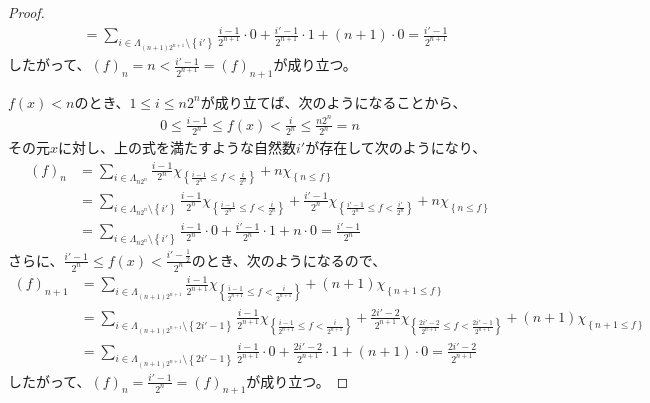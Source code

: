 \documentclass[dvipdfmx]{jsarticle}
\begin{document}
\begin{proof}
\begin{align*}
&= \sum_{i \in \varLambda_{(n + 1)2^{n + 1}} \setminus \left\{ i' \right\}} {\frac{i - 1}{2^{n + 1}} \cdot 0} + \frac{i' - 1}{2^{n + 1}} \cdot 1 + (n + 1) \cdot 0 = \frac{i' - 1}{2^{n + 1}}
\end{align*}
したがって、$(f)_{n} = n < \frac{i' - 1}{2^{n + 1}} = (f)_{n + 1}$が成り立つ。\par
$f(x) < n$のとき、$1 \leq i \leq n2^{n}$が成り立てば、次のようになることから、
\begin{align*}
0 \leq \frac{i - 1}{2^{n}} \leq f(x) < \frac{i}{2^{n}} \leq \frac{n2^{n}}{2^{n}} = n
\end{align*}
その元$x$に対し、上の式を満たすような自然数$i'$が存在して次のようになり、
\begin{align*}
(f)_{n} &= \sum_{i \in \varLambda_{n2^{n}}} {\frac{i - 1}{2^{n}}\chi_{\left\{ \frac{i - 1}{2^{n}} \leq f < \frac{i}{2^{n}} \right\}}} + n\chi_{\left\{ n \leq f \right\}}\\
&= \sum_{i \in \varLambda_{n2^{n}} \setminus \left\{ i' \right\}} {\frac{i - 1}{2^{n}}\chi_{\left\{ \frac{i - 1}{2^{n}} \leq f < \frac{i}{2^{n}} \right\}}} + \frac{i' - 1}{2^{n}}\chi_{\left\{ \frac{i' - 1}{2^{n}} \leq f < \frac{i'}{2^{n}} \right\}} + n\chi_{\left\{ n \leq f \right\}}\\
&= \sum_{i \in \varLambda_{n2^{n}} \setminus \left\{ i' \right\}} {\frac{i - 1}{2^{n}} \cdot 0} + \frac{i' - 1}{2^{n}} \cdot 1 + n \cdot 0 = \frac{i' - 1}{2^{n}}
\end{align*}
さらに、$\frac{i' - 1}{2^{n}} \leq f(x) < \frac{i' - \frac{1}{2}}{2^{n}}$のとき、次のようになるので、
\begin{align*}
(f)_{n + 1} &= \sum_{i \in \varLambda_{(n + 1)2^{n + 1}}} {\frac{i - 1}{2^{n + 1}}\chi_{\left\{ \frac{i - 1}{2^{n + 1}} \leq f < \frac{i}{2^{n + 1}} \right\}}} + (n + 1)\chi_{\left\{ n + 1 \leq f \right\}}\\
&= \sum_{i \in \varLambda_{(n + 1)2^{n + 1}} \setminus \left\{ 2i' - 1 \right\}} {\frac{i - 1}{2^{n + 1}}\chi_{\left\{ \frac{i - 1}{2^{n + 1}} \leq f < \frac{i}{2^{n + 1}} \right\}}} + \frac{2i' - 2}{2^{n + 1}}\chi_{\left\{ \frac{2i' - 2}{2^{n + 1}} \leq f < \frac{2i' - 1}{2^{n + 1}} \right\}} + (n + 1)\chi_{\left\{ n + 1 \leq f \right\}}\\
&= \sum_{i \in \varLambda_{(n + 1)2^{n + 1}} \setminus \left\{ 2i' - 1 \right\}} {\frac{i - 1}{2^{n + 1}} \cdot 0} + \frac{2i' - 2}{2^{n + 1}} \cdot 1 + (n + 1) \cdot 0 = \frac{2i' - 2}{2^{n + 1}}
\end{align*}
したがって、$(f)_{n} = \frac{i' - 1}{2^{n}} = (f)_{n + 1}$が成り立つ。\par

\end{proof}
\end{document}
